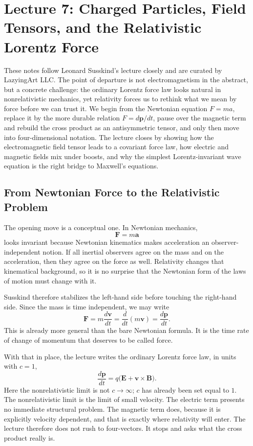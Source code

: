 \chapter{Lecture 7: Charged Particles, Field Tensors, and the Relativistic Lorentz Force}

These notes follow Leonard Susskind's lecture closely and are curated by LazyingArt LLC. The point of departure is not electromagnetism in the abstract, but a concrete challenge: the ordinary Lorentz force law looks natural in nonrelativistic mechanics, yet relativity forces us to rethink what we mean by force before we can trust it. We begin from the Newtonian equation \(F=ma\), replace it by the more durable relation \(F=d\mathbf p/dt\), pause over the magnetic term and rebuild the cross product as an antisymmetric tensor, and only then move into four-dimensional notation. The lecture closes by showing how the electromagnetic field tensor leads to a covariant force law, how electric and magnetic fields mix under boosts, and why the simplest Lorentz-invariant wave equation is the right bridge to Maxwell's equations.

\section{From Newtonian Force to the Relativistic Problem}

The opening move is a conceptual one. In Newtonian mechanics,
\begin{equation}
\mathbf F = m \mathbf a
\end{equation}
looks invariant because Newtonian kinematics makes acceleration an observer-independent notion. If all inertial observers agree on the mass and on the acceleration, then they agree on the force as well. Relativity changes that kinematical background, so it is no surprise that the Newtonian form of the laws of motion must change with it.

Susskind therefore stabilizes the left-hand side before touching the right-hand side. Since the mass is time independent, we may write
\begin{equation}
\mathbf F
=
m \frac{d\mathbf v}{dt}
=
\frac{d}{dt}(m\mathbf v)
=
\frac{d\mathbf p}{dt}.
\end{equation}
This is already more general than the bare Newtonian formula. It is the time rate of change of momentum that deserves to be called force.

With that in place, the lecture writes the ordinary Lorentz force law, in units with \(c=1\),
\begin{equation}
\frac{d\mathbf p}{dt}
=
q\bigl(\mathbf E + \mathbf v \times \mathbf B\bigr).
\end{equation}
Here the nonrelativistic limit is not \(c\to\infty\); \(c\) has already been set equal to \(1\). The nonrelativistic limit is the limit of small velocity. The electric term presents no immediate structural problem. The magnetic term does, because it is explicitly velocity dependent, and that is exactly where relativity will enter. The lecture therefore does not rush to four-vectors. It stops and asks what the cross product really is.

